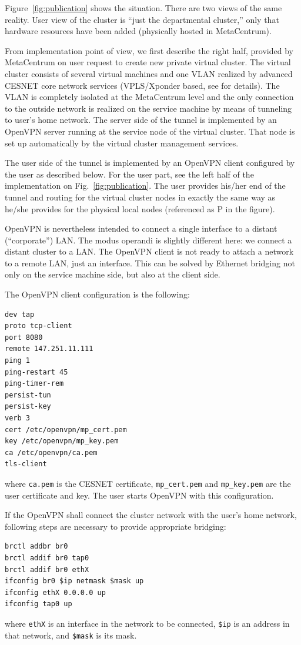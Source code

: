 \documentclass[a4paper]{article}
\begin{document}
Figure~\ref{fig:publication} shows the situation. There are two views
of the same reality. User view of the cluster
is ``just the departmental cluster,'' only that hardware resources have
been added (physically hosted in MetaCentrum).

From implementation point of view, we first describe the right half,
provided by MetaCentrum on user request to create new private virtual cluster. 
The virtual cluster consists of several virtual machines and one VLAN realized by  
advanced CESNET core network services (VPLS/Xponder
based, see \cite{virtcloud-techrep} for details).
The VLAN is completely isolated at the MetaCentrum level and
the only connection to the outside network is realized on the service
machine by means of tunneling to user's home network. The server side of the 
tunnel is implemented by an OpenVPN server running at the
service node of the virtual
cluster. That node is set up automatically by the virtual cluster management
services. 

The user side of the tunnel is implemented by an OpenVPN client
configured by the user as described below. For the
user part, see the left half of the implementation on
Fig.~\ref{fig:publication}. The user provides his/her end of the tunnel and
routing for the virtual cluster nodes in exactly the same way as he/she
provides for the physical local nodes (referenced as P in the figure).

OpenVPN is nevertheless intended to connect a single interface to a distant
(``corporate'') LAN. The modus operandi is slightly different here: we
connect a distant cluster to a LAN. The OpenVPN client is not ready to
attach a network to a remote LAN, just an interface.
This can be solved by Ethernet bridging
not only on the service machine side, but also at the client side.

The OpenVPN client configuration is the following:
\begin{verbatim}
dev tap
proto tcp-client
port 8080
remote 147.251.11.111
ping 1
ping-restart 45
ping-timer-rem
persist-tun
persist-key
verb 3
cert /etc/openvpn/mp_cert.pem
key /etc/openvpn/mp_key.pem
ca /etc/openvpn/ca.pem
tls-client
\end{verbatim}
where \verb'ca.pem' is the CESNET certificate, \verb'mp_cert.pem' and
\verb'mp_key.pem' are the user certificate and key. The user starts OpenVPN
with this configuration.

If the OpenVPN shall connect the cluster network with the user's home
network, following steps are necessary to provide appropriate bridging:
\begin{verbatim}
brctl addbr br0
brctl addif br0 tap0
brctl addif br0 ethX
ifconfig br0 $ip netmask $mask up
ifconfig ethX 0.0.0.0 up
ifconfig tap0 up
\end{verbatim}
where \verb'ethX' is an interface in the network to be connected,
\verb'$ip' is an address in that network, and \verb'$mask' is its mask.
\end{document}
